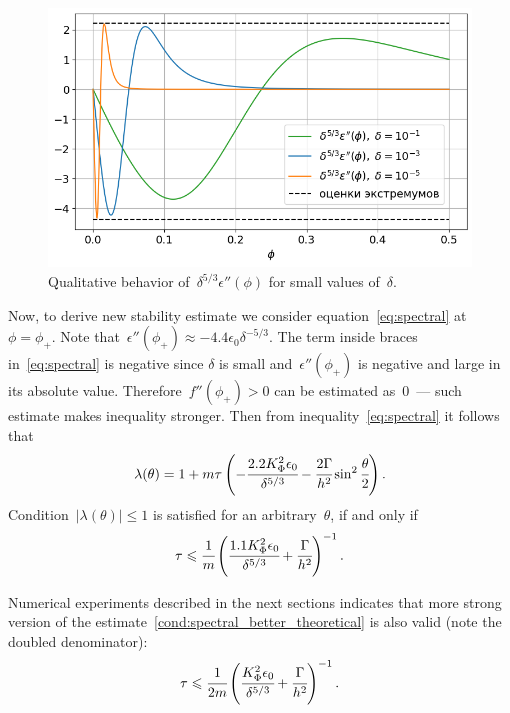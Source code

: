 \begin{figure}[!t]
	\centering
	\includegraphics[width=\textwidth]{figures/eps_phi_phi_multiplied.png}
	\caption{Qualitative behavior of~$\delta^{5 / 3} \epsilon''(\phi)$ for small values of~$\delta$.}
	\label{fig:eps_phi_phi_multiplied}
\end{figure}

Now, to derive new stability estimate we consider equation~\eqref{eq:spectral} at~$\phi = \phi_+$.
Note that~$\epsilon''(\phi_+) \approx -4.4 \epsilon_0 \delta^{-5 / 3}$.
The term inside braces in~\eqref{eq:spectral} is negative since
$\delta$ is small and~$\epsilon''(\phi_+)$ is negative and large in its absolute value.
Therefore~$f''(\phi_+) > 0$ can be estimated as~$0$~--- such estimate makes inequality stronger.
Then from inequality~\eqref{eq:spectral} it follows that 
$$\lambda(\theta) = 1 + m \tau \left( -\cfrac{2.2 K_\Phi^2 \epsilon_0}{\delta^{5 / 3}} - \cfrac{2 \Gamma}{h^2} \sin^2 \cfrac{\theta}{2} \right) {\text{.}}$$
Condition~$|\lambda(\theta)| \leqslant 1$ is satisfied for an arbitrary~$\theta$, if and only if
\begin{equation}
  \tau \leqslant \cfrac{1}{m} \left( \cfrac{1.1 K_\Phi^2 \epsilon_0}{\delta^{5 / 3}} + \cfrac{\Gamma}{h^2} \right)^{-1} {\text{.}}
  \label{cond:spectral_better_theoretical}
\end{equation}

Numerical experiments described in the next sections indicates that
more strong version of the estimate~\eqref{cond:spectral_better_theoretical} is also valid
(note the doubled denominator):
%
\begin{equation}
  \tau \leqslant \cfrac{1}{2m} \left( \cfrac{K_\Phi^2 \epsilon_0}{\delta^{5 / 3}} + \cfrac{\Gamma}{h^2} \right)^{-1} {\text{.}}
  \label{cond:spectral_better}
\end{equation}

